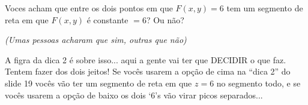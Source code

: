 \documentclass[oneside,12pt]{article}
\begin{document}
\bsk

Voces acham que entre os dois pontos em que $F(x,y)=6$ tem um segmento
de reta em que $F(x,y)$ é constante $= 6$? Ou não?

{\sl (Umas pessoas acharam que sim, outras que não)}

A figra da dica 2 é sobre isso... aqui a gente vai ter que DECIDIR o que faz.
Tentem fazer dos dois jeitos! Se vocês usarem a opção de cima na ``dica
2'' do slide 19 vocês vão ter um segmento de reta em que $z = 6$ no
segmento todo, e se vocês usarem a opção de baixo os dois `6's vão
virar picos separados...





% 
% 
% 
% 
% 
% 
% 
% 
% 
% 


% 
% 
% 
% 
% 
% 
% 
\end{document}
